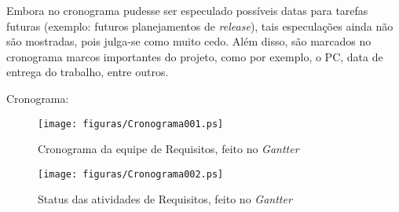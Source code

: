 Embora no cronograma pudesse ser especulado possíveis datas para tarefas futuras (exemplo: futuros planejamentos de \emph{release}), tais especulações ainda não são mostradas, pois julga-se como muito cedo. Além disso, são marcados no cronograma marcos importantes do projeto, como por exemplo, o PC, data de entrega do trabalho, entre outros.

Cronograma:

\begin{figure}[h]
  \centering
  \caption{Cronograma da equipe de Requisitos, feito no \emph{Gantter}}
  \texttt{[image: figuras/Cronograma001.ps]}
\end{figure}

\begin{figure}[h]
  \centering
  \caption{Status das atividades de Requisitos, feito no \emph{Gantter}}
  \texttt{[image: figuras/Cronograma002.ps]}
\end{figure}

